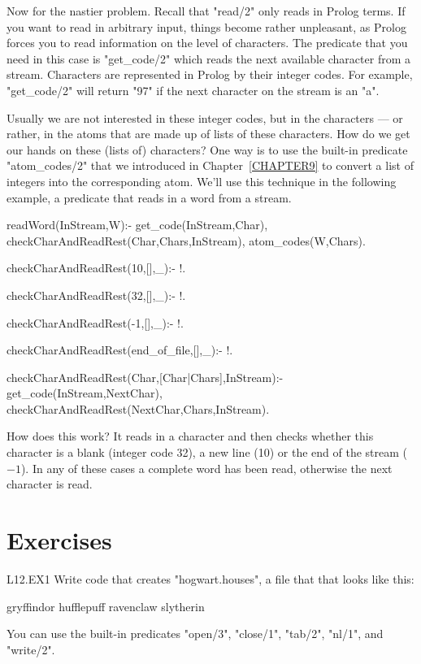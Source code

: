 Now for the nastier problem.  Recall that "read/2" only reads in
Prolog terms. If you want to read in arbitrary input, things become
rather unpleasant, as Prolog forces you to read information on the
level of characters.  The predicate that you need in this case is
"get\_code/2" which reads the next
available character from a stream.  Characters are represented in
Prolog by their integer codes. For example, "get\_code/2" will return "97"
if the next character on the stream is an "a".

Usually we are not interested in these integer codes, but in the
characters --- or rather, in the atoms that are made up of lists of
these characters. How do we get our hands on these (lists of)
characters? One way is to use the built-in predicate "atom\_codes/2"
that we introduced in
Chapter~\ref{CHAPTER9} to convert a list of integers into the
corresponding atom. We'll use this technique in the following example,
a predicate that reads in a word from a
stream.

\begin{LPNcodedisplay}
readWord(InStream,W):-
   get_code(InStream,Char),
   checkCharAndReadRest(Char,Chars,InStream),
   atom_codes(W,Chars).


checkCharAndReadRest(10,[],_):- !.

checkCharAndReadRest(32,[],_):- !.

checkCharAndReadRest(-1,[],_):- !.

checkCharAndReadRest(end_of_file,[],_):- !.

checkCharAndReadRest(Char,[Char|Chars],InStream):-
   get_code(InStream,NextChar),
   checkCharAndReadRest(NextChar,Chars,InStream).
\end{LPNcodedisplay}

How does this work?  It reads in a character and then checks whether
this character is a blank (integer code 32), a new line (10) or the
end of the stream ($-1$). In any of these cases a complete word has been
read, otherwise the next character is read.


\section{Exercises}\label{SEC.L12.EXERCISES}

\begin{LPNexercise}{L12.EX1}
Write code that creates  "hogwart.houses", a file that  that looks
like this:
\begin{LPNcodedisplay}
       gryffindor
hufflepuff     ravenclaw
       slytherin
\end{LPNcodedisplay}
You can use the built-in predicates "open/3", "close/1", "tab/2",
"nl/1", and "write/2".
\end{LPNexercise}


